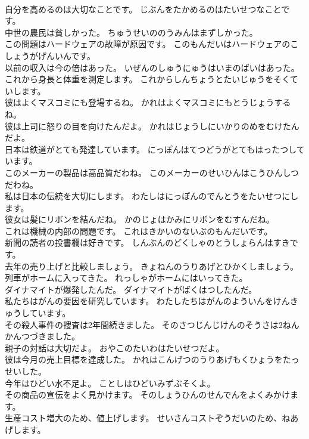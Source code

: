 \documentclass[8pt]{extreport}
\begin{document}
\begin{CJK}{UTF8}{min}
\\	自分を高めるのは大切なことです。	じぶんをたかめるのはたいせつなことです。 
\\	中世の農民は貧しかった。	ちゅうせいののうみんはまずしかった。 
\\	この問題はハードウェアの故障が原因です。	このもんだいはハードウェアのこしょうがげんいんです。 
\\	以前の収入は今の倍はあった。	いぜんのしゅうにゅうはいまのばいはあった。 
\\	これから身長と体重を測定します。	これからしんちょうとたいじゅうをそくていします。 
\\	彼はよくマスコミにも登場するね。	かれはよくマスコミにもとうじょうするね。 
\\	彼は上司に怒りの目を向けたんだよ。	かれはじょうしにいかりのめをむけたんだよ。 
\\	日本は鉄道がとても発達しています。	にっぽんはてつどうがとてもはったつしています。 
\\	このメーカーの製品は高品質だわね。	このメーカーのせいひんはこうひんしつだわね。 
\\	私は日本の伝統を大切にします。	わたしはにっぽんのでんとうをたいせつにします。 
\\	彼女は髪にリボンを結んだね。	かのじょはかみにリボンをむすんだね。 
\\	これは機械の内部の問題です。	これはきかいのないぶのもんだいです。 
\\	新聞の読者の投書欄は好きです。	しんぶんのどくしゃのとうしょらんはすきです。 
\\	去年の売り上げと比較しましょう。	きょねんのうりあげとひかくしましょう。 
\\	列車がホームに入ってきた。	れっしゃがホームにはいってきた。 
\\	ダイナマイトが爆発したんだ。	ダイナマイトがばくはつしたんだ。 
\\	私たちはがんの要因を研究しています。	わたしたちはがんのよういんをけんきゅうしています。 
\\	その殺人事件の捜査は2年間続きました。	そのさつじんじけんのそうさは2ねんかんつづきました。 
\\	親子の対話は大切だよ。	おやこのたいわはたいせつだよ。 
\\	彼は今月の売上目標を達成した。	かれはこんげつのうりあげもくひょうをたっせいした。 
\\	今年はひどい水不足よ。	ことしはひどいみずぶそくよ。 
\\	その商品の宣伝をよく見かけます。	そのしょうひんのせんでんをよくみかけます。 
\\	生産コスト増大のため、値上げします。	せいさんコストぞうだいのため、ねあげします。 

\end{CJK}
\end{document}
